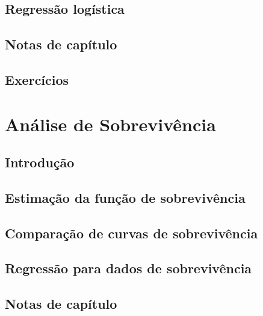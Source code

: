 \documentclass[
]{latex/krantz}
\theoremstyle{definition}
\theoremstyle{definition}
\theoremstyle{definition}
\theoremstyle{definition}
\theoremstyle{remark}
\begin{document}
\hypertarget{regressuxe3o-loguxedstica}{%
\section{Regressão logística}\label{regressuxe3o-loguxedstica}}

\hypertarget{notas-de-capuxedtulo-4}{%
\section{Notas de capítulo}\label{notas-de-capuxedtulo-4}}

\hypertarget{exercuxedcios-4}{%
\section{Exercícios}\label{exercuxedcios-4}}

\hypertarget{anuxe1lise-de-sobrevivuxeancia}{%
\chapter{Análise de Sobrevivência}\label{anuxe1lise-de-sobrevivuxeancia}}

\hypertarget{introduuxe7uxe3o-5}{%
\section{Introdução}\label{introduuxe7uxe3o-5}}

\hypertarget{estimauxe7uxe3o-da-funuxe7uxe3o-de-sobrevivuxeancia}{%
\section{Estimação da função de sobrevivência}\label{estimauxe7uxe3o-da-funuxe7uxe3o-de-sobrevivuxeancia}}

\hypertarget{comparauxe7uxe3o-de-curvas-de-sobrevivuxeancia}{%
\section{Comparação de curvas de sobrevivência}\label{comparauxe7uxe3o-de-curvas-de-sobrevivuxeancia}}

\hypertarget{regressuxe3o-para-dados-de-sobrevivuxeancia}{%
\section{Regressão para dados de sobrevivência}\label{regressuxe3o-para-dados-de-sobrevivuxeancia}}

\hypertarget{notas-de-capuxedtulo-5}{%
\section{Notas de capítulo}\label{notas-de-capuxedtulo-5}}
\end{document}
